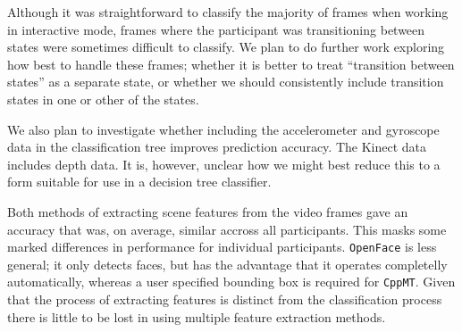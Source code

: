 \documentclass{sigchi-ext}
\begin{document}
Although it was straightforward to classify the majority of frames when working in interactive mode, frames where the participant was transitioning between states were sometimes difficult to classify.  We plan to do further work exploring how best to handle these frames; whether it is better to treat ``transition between states'' as a separate state, or whether we should consistently include transition states in one or other of the states.  

We also plan to investigate whether including the accelerometer and gyroscope data in the classification tree improves prediction accuracy.   The Kinect data includes depth data.  It is, however, unclear how we might best reduce this to a form suitable for use in a decision tree classifier.  

Both methods of extracting scene features from the video frames gave an accuracy that was, on average, similar accross all participants.  This masks some marked differences in performance for individual participants.  \texttt{OpenFace} is less general; it only detects faces, but has the advantage that it operates completelly automatically, whereas a user specified bounding box is required for \texttt{CppMT}.  Given that the process of extracting features is distinct from the classification process there is little to be lost in using multiple feature extraction methods.  
\end{document}
